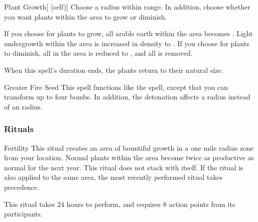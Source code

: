 \lowercase{\hypertarget{spell:Plant Growth}{}}\label{spell:Plant Growth}
\begin{ability}[\nth{2}]{\hypertarget{spell:Plant Growth}{Plant Growth}}[ (self)]
Choose a \arealarge radius within \rnglong range.
In addition, choose whether you want plants within the area to grow or diminish.

If you choose for plants to grow, all arable earth within the area becomes .
Light undergrowth within the area is increased in density to .
If you choose for plants to diminish, all  in the area is reduced to , and all  is removed.

When this spell's duration ends, the plants return to their natural size.
\end{ability}
\vspace{0.25em}



\lowercase{\hypertarget{spell:Greater Fire Seed}{}}\label{spell:Greater Fire Seed}
\begin{ability}[\nth{4}]{\hypertarget{spell:Greater Fire Seed}{Greater Fire Seed}}
This spell functions like the  spell, except that you can transform up to four bombs.
In addition, the detonation affects a \areamed radius instead of an \areasmall radius.
\end{ability}
\vspace{0.25em}



\subsubsection{Rituals}


\lowercase{\hypertarget{spell:Fertility}{}}\label{spell:Fertility}
\begin{ability}[\nth{2}]{\hypertarget{spell:Fertility}{Fertility}}
This ritual creates an area of bountiful growth in a one mile radius zone from your location.
Normal plants within the area become twice as productive as normal for the next year.
This ritual does not stack with itself.
If the  ritual is also applied to the same area, the most recently performed ritual takes precedence.

This ritual takes 24 hours to perform, and requires 8 action points from its participants.
\end{ability}
\vspace{0.25em}



